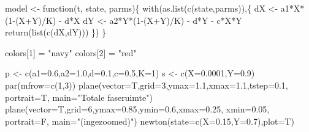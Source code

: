 \documentclass[
  a4paper,
]{scrbook}
\newenvironment{Shaded}{\begin{snugshade}}{\end{snugshade}}
\newcommand{\AttributeTok}[1]{\textcolor[rgb]{0.40,0.45,0.13}{#1}}
\newcommand{\ControlFlowTok}[1]{\textcolor[rgb]{0.00,0.23,0.31}{#1}}
\newcommand{\DecValTok}[1]{\textcolor[rgb]{0.68,0.00,0.00}{#1}}
\newcommand{\FloatTok}[1]{\textcolor[rgb]{0.68,0.00,0.00}{#1}}
\newcommand{\FunctionTok}[1]{\textcolor[rgb]{0.28,0.35,0.67}{#1}}
\newcommand{\NormalTok}[1]{\textcolor[rgb]{0.00,0.23,0.31}{#1}}
\newcommand{\OtherTok}[1]{\textcolor[rgb]{0.00,0.23,0.31}{#1}}
\newcommand{\SpecialCharTok}[1]{\textcolor[rgb]{0.37,0.37,0.37}{#1}}
\newcommand{\StringTok}[1]{\textcolor[rgb]{0.13,0.47,0.30}{#1}}
\theoremstyle{definition}
\theoremstyle{remark}
\begin{document}
\begin{tcolorbox}
\begin{Shaded}
\begin{Highlighting}[]
\NormalTok{model }\OtherTok{\textless{}{-}} \ControlFlowTok{function}\NormalTok{(t, state, parms)\{}
  \FunctionTok{with}\NormalTok{(}\FunctionTok{as.list}\NormalTok{(}\FunctionTok{c}\NormalTok{(state,parms)),\{}
\NormalTok{    dX }\OtherTok{\textless{}{-}}\NormalTok{ a1}\SpecialCharTok{*}\NormalTok{X}\SpecialCharTok{*}\NormalTok{(}\DecValTok{1}\SpecialCharTok{{-}}\NormalTok{(X}\SpecialCharTok{+}\NormalTok{Y)}\SpecialCharTok{/}\NormalTok{K) }\SpecialCharTok{{-}}\NormalTok{ d}\SpecialCharTok{*}\NormalTok{X}
\NormalTok{    dY }\OtherTok{\textless{}{-}}\NormalTok{ a2}\SpecialCharTok{*}\NormalTok{Y}\SpecialCharTok{*}\NormalTok{(}\DecValTok{1}\SpecialCharTok{{-}}\NormalTok{(X}\SpecialCharTok{+}\NormalTok{Y)}\SpecialCharTok{/}\NormalTok{K) }\SpecialCharTok{{-}}\NormalTok{ d}\SpecialCharTok{*}\NormalTok{Y }\SpecialCharTok{{-}}\NormalTok{ c}\SpecialCharTok{*}\NormalTok{X}\SpecialCharTok{*}\NormalTok{Y}
    \FunctionTok{return}\NormalTok{(}\FunctionTok{list}\NormalTok{(}\FunctionTok{c}\NormalTok{(dX,dY)))}
\NormalTok{  \})}
\NormalTok{\}  }

\NormalTok{colors[}\DecValTok{1}\NormalTok{] }\OtherTok{=} \StringTok{"navy"}
\NormalTok{colors[}\DecValTok{2}\NormalTok{] }\OtherTok{=} \StringTok{"red"}

\NormalTok{p }\OtherTok{\textless{}{-}} \FunctionTok{c}\NormalTok{(}\AttributeTok{a1=}\FloatTok{0.6}\NormalTok{,}\AttributeTok{a2=}\FloatTok{1.0}\NormalTok{,}\AttributeTok{d=}\FloatTok{0.1}\NormalTok{,}\AttributeTok{c=}\FloatTok{0.5}\NormalTok{,}\AttributeTok{K=}\DecValTok{1}\NormalTok{)}
\NormalTok{s }\OtherTok{\textless{}{-}} \FunctionTok{c}\NormalTok{(}\AttributeTok{X=}\FloatTok{0.0001}\NormalTok{,}\AttributeTok{Y=}\FloatTok{0.9}\NormalTok{)}
\FunctionTok{par}\NormalTok{(}\AttributeTok{mfrow=}\FunctionTok{c}\NormalTok{(}\DecValTok{1}\NormalTok{,}\DecValTok{3}\NormalTok{))}
\FunctionTok{plane}\NormalTok{(}\AttributeTok{vector=}\NormalTok{T,}\AttributeTok{grid=}\DecValTok{3}\NormalTok{,}\AttributeTok{ymax=}\FloatTok{1.1}\NormalTok{,}\AttributeTok{xmax=}\FloatTok{1.1}\NormalTok{,}\AttributeTok{tstep=}\FloatTok{0.1}\NormalTok{, }\AttributeTok{portrait=}\NormalTok{T, }\AttributeTok{main=}\StringTok{"Totale faseruimte"}\NormalTok{)}
\FunctionTok{plane}\NormalTok{(}\AttributeTok{vector=}\NormalTok{T,}\AttributeTok{grid=}\DecValTok{6}\NormalTok{,}\AttributeTok{ymax=}\FloatTok{0.85}\NormalTok{,}\AttributeTok{ymin=}\FloatTok{0.6}\NormalTok{,}\AttributeTok{xmax=}\FloatTok{0.25}\NormalTok{, }\AttributeTok{xmin=}\FloatTok{0.05}\NormalTok{, }\AttributeTok{portrait=}\NormalTok{F, }\AttributeTok{main=}\StringTok{"(ingezoomed)"}\NormalTok{)}
\FunctionTok{newton}\NormalTok{(}\AttributeTok{state=}\FunctionTok{c}\NormalTok{(}\AttributeTok{X=}\FloatTok{0.15}\NormalTok{,}\AttributeTok{Y=}\FloatTok{0.7}\NormalTok{),}\AttributeTok{plot=}\NormalTok{T)}
\end{Highlighting}
\end{Shaded}


\end{tcolorbox}
\end{document}
